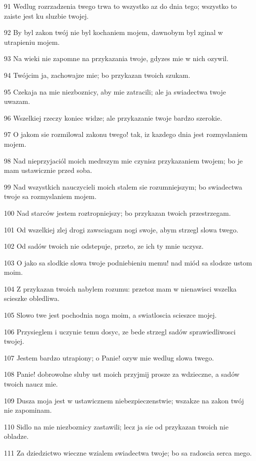 \par 91 Wedlug rozrzadzenia twego trwa to wszystko az do dnia tego; wszystko to zaiste jest ku sluzbie twojej.
\par 92 By byl zakon twój nie byl kochaniem mojem, dawnobym byl zginal w utrapieniu mojem.
\par 93 Na wieki nie zapomne na przykazania twoje, gdyzes mie w nich ozywil.
\par 94 Twójcim ja, zachowajze mie; bo przykazan twoich szukam.
\par 95 Czekaja na mie niezboznicy, aby mie zatracili; ale ja swiadectwa twoje uwazam.
\par 96 Wszelkiej rzeczy koniec widze; ale przykazanie twoje bardzo szerokie.
\par 97 O jakom sie rozmilowal zakonu twego! tak, iz kazdego dnia jest rozmyslaniem mojem.
\par 98 Nad nieprzyjaciól moich medrszym mie czynisz przykazaniem twojem; bo je mam ustawicznie przed soba.
\par 99 Nad wszystkich nauczycieli moich stalem sie rozumniejszym; bo swiadectwa twoje sa rozmyslaniem mojem.
\par 100 Nad starców jestem roztropniejszy; bo przykazan twoich przestrzegam.
\par 101 Od wszelkiej zlej drogi zawsciagam nogi swoje, abym strzegl slowa twego.
\par 102 Od sadów twoich nie odstepuje, przeto, ze ich ty mnie uczysz.
\par 103 O jako sa slodkie slowa twoje podniebieniu memu! nad miód sa slodsze ustom moim.
\par 104 Z przykazan twoich nabylem rozumu: przetoz mam w nienawisci wszelka scieszke obledliwa.
\par 105 Slowo twe jest pochodnia noga moim, a swiatloscia scieszce mojej.
\par 106 Przysieglem i uczynie temu dosyc, ze bede strzegl sadów sprawiedliwosci twojej.
\par 107 Jestem bardzo utrapiony; o Panie! ozyw mie wedlug slowa twego.
\par 108 Panie! dobrowolne sluby ust moich przyjmij prosze za wdzieczne, a sadów twoich naucz mie.
\par 109 Dusza moja jest w ustawicznem niebezpieczenstwie; wszakze na zakon twój nie zapominam.
\par 110 Sidlo na mie niezboznicy zastawili; lecz ja sie od przykazan twoich nie obladze.
\par 111 Za dziedzictwo wieczne wzialem swiadectwa twoje; bo sa radoscia serca mego.
